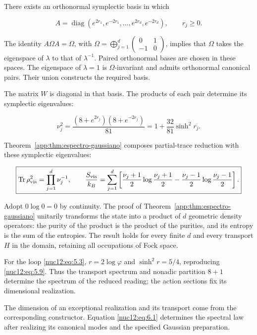 There exists an orthonormal symplectic basis in which

\[
A=\operatorname{diag}(e^{2r_1},e^{-2r_1},\ldots,
e^{2r_d},e^{-2r_d}),\qquad r_j\ge0.
\]

The identity \(A\Omega A=\Omega\), with \(\Omega=\bigoplus_{j=1}^d\left(\begin{smallmatrix}0&1\\-1&0\end{smallmatrix}\right)\), implies that \(\Omega\) takes the eigenspace of \(\lambda\) to that of \(\lambda^{-1}\). Paired orthonormal bases are chosen in these spaces. The eigenspace of \(\lambda=1\) is \(\Omega\)-invariant and admits orthonormal canonical pairs. Their union constructs the required basis.

The matrix \(W\) is diagonal in that basis. The products of each pair determine its symplectic eigenvalues:

\begin{equation}
\boxed{\nu_j^2=
\frac{(8+e^{2r_j})(8+e^{-2r_j})}{81}
=1+\frac{32}{81}\sinh^2r_j.}
\label{nuc12:eq:6.1}
\end{equation}

Theorem~\ref{app:thm:espectro-gaussiano} composes partial-trace reduction with these symplectic eigenvalues:

\begin{equation}
\boxed{\operatorname{Tr}\rho_{\rm vis}^2=\prod_{j=1}^d\nu_j^{-1},
\qquad
\frac{S_{\rm vis}}{k_B}=\sum_{j=1}^d
\left[\frac{\nu_j+1}{2}\log\frac{\nu_j+1}{2}
-\frac{\nu_j-1}{2}\log\frac{\nu_j-1}{2}\right].}
\label{nuc12:eq:6.2}
\end{equation}

Adopt \(0\log0=0\) by continuity. The proof of Theorem~\ref{app:thm:espectro-gaussiano} unitarily transforms the state into a product of \(d\) geometric density operators: the purity of the product is the product of the purities, and its entropy is the sum of the entropies. The result holds for every finite \(d\) and every transport \(H\) in the domain, retaining all occupations of Fock space.

For the loop \eqref{nuc12:eq:5.3}, \(r=2\log\varphi\) and \(\sinh^2r=5/4\), reproducing \eqref{nuc12:eq:5.9}. Thus the transport spectrum and nonadic partition \(8+1\) determine the spectrum of the reduced reading; the action sections fix its dimensional realization.

The dimension of an exceptional realization and its transport come from the corresponding constructor. Equation \eqref{nuc12:eq:6.1} determines the spectral law after realizing its canonical modes and the specified Gaussian preparation.

